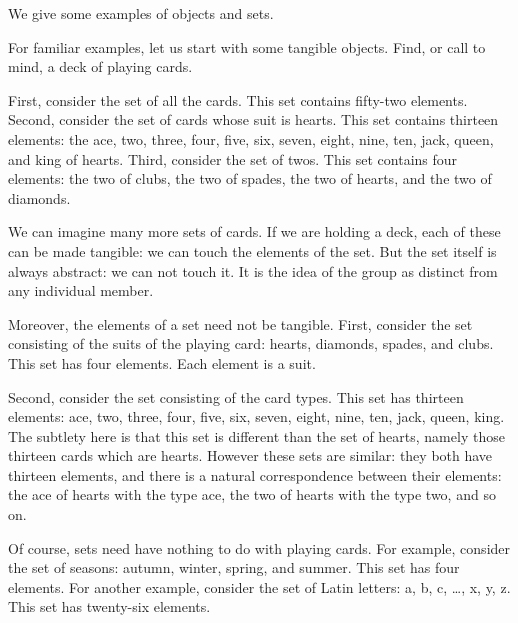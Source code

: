 

We give some
examples
of objects
and sets.


For familiar examples,
let us start
with some tangible
objects.
Find, or call to
mind,
a deck
of playing cards.

First, consider
the set of all
the cards.
This set contains
fifty-two elements.
Second, consider
the set of cards
whose suit is hearts.
This set contains
thirteen elements:
the ace, two, three, four, five,
six, seven, eight, nine, ten,
jack, queen, and
king of hearts.
Third, consider
the set of twos.
This set contains
four elements:
the two of clubs,
the two of spades,
the two of hearts,
and the two of diamonds.

We can imagine many
more sets of cards.
If we are holding a deck,
each of these can be
made tangible: we can
touch the elements of
the set.
But the set itself
is always abstract:
we can not touch it.
It is the idea of the
group as distinct from
any individual member.

Moreover, the
elements of a set
need not be tangible.
First, consider the set
consisting of the suits of
the playing card:
hearts, diamonds, spades, and clubs.
This set has four elements.
Each element is a suit.

Second, consider the set
consisting of the card types.
This set has thirteen elements:
ace, two, three, four, five,
six, seven, eight, nine, ten,
jack, queen, king.
The subtlety here is that
this set is different than
the set of hearts, namely
those thirteen cards which are
hearts.
However these sets are
similar: they both have thirteen
elements, and there is a natural
correspondence between their
elements: the ace of hearts
with the type ace, the two
of hearts with the type two,
and so on.

Of course, sets need have nothing to
do with playing cards.
For example, consider the set of
seasons: autumn, winter, spring,
and summer.
This set has four elements.
For another example,
consider the set of Latin letters:
a, b, c, \dots, x, y, z.
This set has twenty-six elements.

